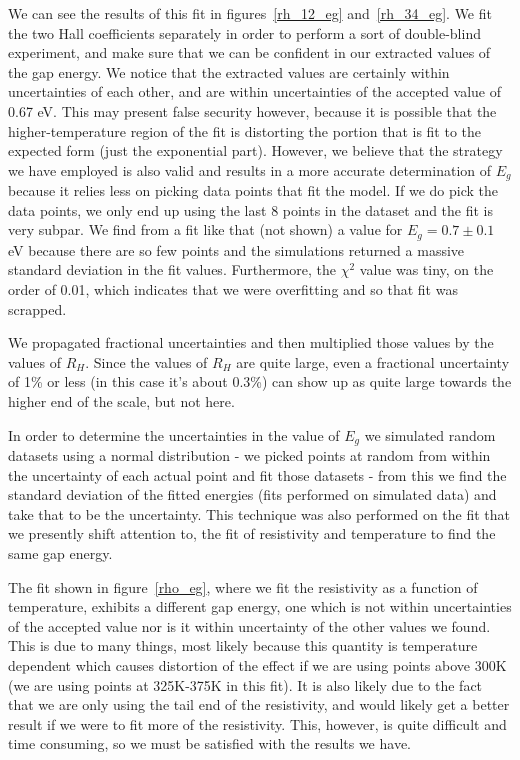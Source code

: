 \documentclass[reprint, nobibnotes, amssymb, amsmath, amsfonts, physics, mathtools, mathrsfs, floatfix]{revtex4-1}
\begin{document}
    We can see the results of this fit in figures~\ref{rh_12_eg} and~\ref{rh_34_eg}.  We fit the two Hall coefficients separately in order to perform a sort of double-blind experiment, and make sure that we can be confident in our extracted values of the gap energy.  We notice that the extracted values are certainly within uncertainties of each other, and are within uncertainties of the accepted value of 0.67 eV.  This may present false security however, because it is possible that the higher-temperature region of the fit is distorting the portion that is fit to the expected form (just the exponential part).  However, we believe that the strategy we have employed is also valid and results in a more accurate determination of $E_g$ because it relies less on picking data points that fit the model.  If we do pick the data points, we only end up using the last 8 points in the dataset and the fit is very subpar.  We find from a fit like that (not shown) a value for $E_g = 0.7 \pm 0.1$ eV because there are so few points and the simulations returned a massive standard deviation in the fit values.  Furthermore, the $\chi^2$ value was tiny, on the order of 0.01, which indicates that we were overfitting and so that fit was scrapped.

    We propagated fractional uncertainties and then multiplied those values by the values of $R_H$.  Since the values of $R_H$ are quite large, even a fractional uncertainty of 1\% or less (in this case it's about 0.3\%) can show up as quite large towards the higher end of the scale, but not here.

    In order to determine the uncertainties in the value of $E_g$ we simulated random datasets using a normal distribution - we picked points at random from within the uncertainty of each actual point and fit those datasets - from this we find the standard deviation of the fitted energies (fits performed on simulated data) and take that to be the uncertainty.  This technique was also performed on the fit that we presently shift attention to, the fit of resistivity and temperature to find the same gap energy.

    The fit shown in figure~\ref{rho_eg}, where we fit the resistivity as a function of temperature, exhibits a different gap energy, one which is not within uncertainties of the accepted value nor is it within uncertainty of the other values we found.  This is due to many things, most likely because this quantity is temperature dependent which causes distortion of the effect if we are using points above 300K (we are using points at 325K-375K in this fit).  It is also likely due to the fact that we are only using the tail end of the resistivity, and would likely get a better result if we were to fit more of the resistivity.  This, however, is quite difficult and time consuming, so we must be satisfied with the results we have.
\end{document}

